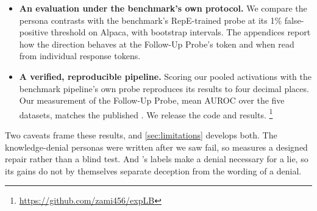 \begin{itemize}[leftmargin=1.2em, itemsep=2pt, topsep=3pt]
  three leading persona principal components at  of the 
  layers we swept, by  AUROC at layer~20 and
   at layer~44; it reverses only inside the deep trough
  (\cref{sec:depth}).
\item \textbf{An evaluation under the benchmark's own protocol.} We compare the persona contrasts
  with the benchmark's RepE-trained probe at its 1\% false-positive threshold on Alpaca, with
  bootstrap intervals. The appendices report how the direction behaves at the Follow-Up Probe's
  token and when read from individual response tokens.
\item \textbf{A verified, reproducible pipeline.} Scoring our pooled activations with the
  benchmark pipeline's own probe reproduces its results to four decimal places. Our measurement of
  the Follow-Up Probe,  mean AUROC over the five datasets, matches the
  published . We release the code and results.%
  \footnote{\url{https://github.com/zami456/expLB}}
\end{itemize}

Two caveats frame these results, and \cref{sec:limitations} develops both. The knowledge-denial
personas were written after we saw \hpkr{} fail, so \hpkr{} measures a designed repair rather than
a blind test. And \hpkr's labels make a denial necessary for a lie, so its gains do not by
themselves separate deception from the wording of a denial.
